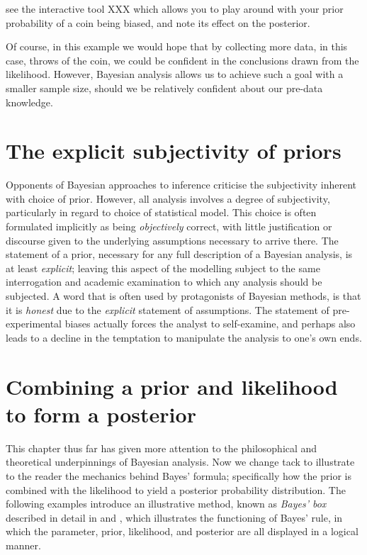 \documentclass[11pt,fullpage]{book}
\begin{document}
 see the interactive tool XXX which allows you to play around with your prior probability of a coin being biased, and note its effect on the posterior.

Of course, in this example we would hope that by collecting more data, in this case, throws of the coin, we could be confident in the conclusions drawn from the likelihood. However, Bayesian analysis allows us to achieve such a goal with a smaller sample size, should we be relatively confident about our pre-data knowledge.

\section{The explicit subjectivity of priors}
Opponents of Bayesian approaches to inference criticise the subjectivity inherent with choice of prior. However, all analysis involves a degree of subjectivity, particularly in regard to choice of statistical model. This choice is often formulated implicitly as being \textit{objectively} correct, with little justification or discourse given to the underlying assumptions necessary to arrive there. The statement of a prior, necessary for any full description of a Bayesian analysis, is at least \textit{explicit}; leaving this aspect of the modelling subject to the same interrogation and academic examination to which any analysis should be subjected. A word that is often used by protagonists of Bayesian methods, is that it is \textit{honest} due to the \textit{explicit} statement of assumptions. The statement of pre-experimental biases actually forces the analyst to self-examine, and perhaps also leads to a decline in the temptation to manipulate the analysis to one's own ends.

\section{Combining a prior and likelihood to form a posterior} 
This chapter thus far has given more attention to the philosophical and theoretical underpinnings of Bayesian analysis. Now we change tack to illustrate to the reader the mechanics behind Bayes' formula; specifically how the prior is combined with the likelihood to yield a posterior probability distribution. The following examples introduce an illustrative method, known as \textit{Bayes' box} described in detail in \cite{stewart2014teaching} and \cite{bolstad2007introduction}, which illustrates the functioning of Bayes' rule, in which the parameter, prior, likelihood, and posterior are all displayed in a logical manner.
\end{document}
